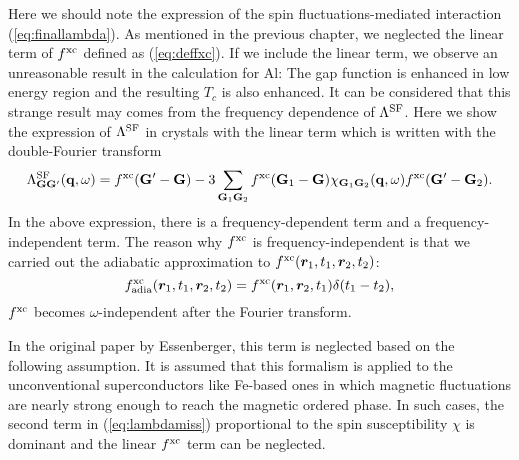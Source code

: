 Here we should note the expression of the spin fluctuations-mediated interaction (\ref{eq:finallambda}).
As mentioned in the previous chapter, we neglected the linear term of $f^{\rm xc}$ defined as 
(\ref{eq:deffxc}). If we include the linear term, we observe an unreasonable result in the
calculation for Al: The gap function is enhanced in low energy region and the resulting $T_c$
is also enhanced. It can be considered that this strange result may comes from the frequency
dependence of $\Lambda^{\rm SF}$. Here we show the expression of $\Lambda^{\rm SF}$ in crystals with 
the linear term which is written with the double-Fourier transform\cite{Hybertsen1987}
%
\begin{equation}
	\Lambda^{\rm SF}_{\mathbf G \mathbf G'}(\mathbf q, \omega) = f^{\rm xc}(\mathbf G' - \mathbf G) - 
	3\sum_{\mathbf G_1 \mathbf G_2} f^{\rm xc}(\mathbf G_1 - \mathbf G)\chi_{\mathbf G_1 \mathbf G_2}(\mathbf q, \omega)
	f^{\rm xc}(\mathbf G' - \mathbf G_2).
	\label{eq:lambdamiss}
\end{equation}
%
In the above expression, there is a frequency-dependent term and a frequency-independent term.
The reason why $f^{\rm xc}$ is frequency-independent is that we carried out 
the adiabatic approximation to $f^{\rm xc}(\bm r_1,t_1, \bm r_2,t_2)$:
%
\begin{equation}
	f^{\rm xc}_{\rm adia}(\bm r_1,t_1, \bm r_2, t_2) = f^{\rm xc}(\bm r_1,\bm r_2, t_1)\delta(t_1 - t_2),
	\label{eq:adiabatic}
\end{equation}
%
$f^{\rm xc}$ becomes $\omega$-independent after the Fourier transform.

In the original paper by Essenberger\cite{Essenberger2014}, this term is neglected based on the following assumption.
It is assumed that this formalism is applied to the unconventional superconductors like Fe-based ones
in which magnetic fluctuations are nearly strong enough to reach the magnetic ordered phase.
In such cases, the second term in (\ref{eq:lambdamiss}) proportional to the spin 
susceptibility $\chi$ is dominant and the linear $f^{\rm xc}$ term can be neglected.

